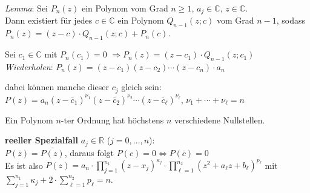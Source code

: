 \linie

\emph{Lemma}: Sei $P_n(z)$ ein Polynom vom Grad $n \ge 1$,
$a_j \in \mathbb{C}$, $z \in \mathbb{C}$. \\
Dann existiert für jedes $c \in \mathbb{C}$ ein Polynom $Q_{n-1}(z; c)$ vom
Grad $n-1$, sodass \\
$P_n(z) = (z - c) \cdot Q_{n-1}(z; c) + P_n(c)$.

Sei $c_1 \in \mathbb{C}$ mit $P_n(c_1) = 0$
$\Rightarrow P_n(z) = (z - c_1) \cdot Q_{n-1}(z; c_1)$ \\
\emph{Wiederholen}: $P_n(z) = (z - c_1) (z - c_2) \cdots
(z - c_n) \cdot a_n$

dabei können manche dieser $c_j$ gleich sein: \\
$P(z) = a_n (z - \widetilde{c_1})^{\nu_1} (z - \widetilde{c_2})^{\nu_2} \cdots
(z - \widetilde{c_\ell})^{\nu_\ell}$, \quad $\nu_1 + \cdots + \nu_\ell = n$

Ein Polynom $n$-ter Ordnung hat höchstens $n$ verschiedene Nullstellen.

\linie

\textbf{reeller Spezialfall} $a_j \in \mathbb{R}$ ($j = 0, \ldots, n$): \\
$P(\overline{z}) = \overline{P(z)}$, \quad
daraus folgt $P(c) = 0 \Leftrightarrow P(\overline{c}) = 0$ \\
Es ist also $P(z) = a_n \cdot \prod_{j=1}^{n_1} (z - x_j)^{\kappa_j} \cdot
\prod_{\ell=1}^{n_2} (z^2 + a_\ell z + b_\ell)^{p_\ell}$ \quad mit
$\sum_{j=1}^{n_1} \kappa_j + 2 \cdot \sum_{\ell=1}^{n_2} p_\ell = n$.

\pagebreak
